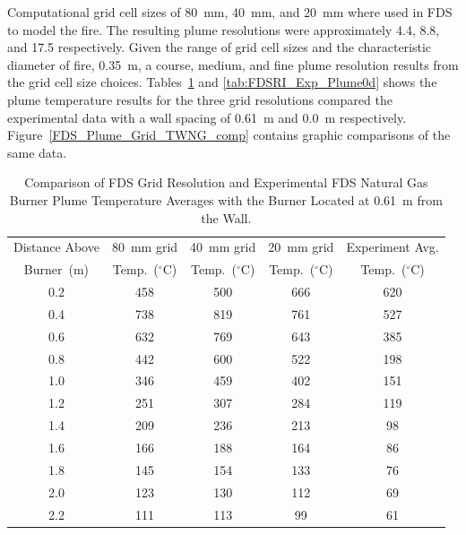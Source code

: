 \documentclass[twoside]{uocthesis}
\begin{document}
Computational grid cell sizes of 80~mm, 40~mm, and 20~mm where used in FDS to model the fire.  The resulting plume resolutions were approximately 4.4, 8.8, and 17.5 respectively. Given the range of grid cell sizes and the characteristic diameter of fire, 0.35~m, a course, medium, and fine plume resolution results from the grid cell size choices. Tables~\ref{tab:FDSRI_Exp_Plume2d} and \ref{tab:FDSRI_Exp_Plume0d} shows the plume temperature results for the three grid resolutions compared the experimental data with a wall spacing of 0.61~m and 0.0~m respectively. Figure~\ref{FDS_Plume_Grid_TWNG_comp} contains graphic comparisons of the same data.   

\begin{table}[ht!]
  \small
  \centering
  \begin{tabular}{|c|c|c|c|c|}
    \hline Distance Above  & 80~mm grid      & 40~mm grid     & 20~mm grid    & Experiment Avg. \\
    Burner~(m)     & Temp.~($^{\circ}$C) & Temp.~($^{\circ}$C) & Temp.~($^{\circ}$C)  & Temp.~($^{\circ}$C) \\ \hline
    \hline 0.2         & 458            & 500           & 666     & 620   \\
    \hline 0.4         & 738            & 819           & 761     & 527   \\
    \hline 0.6         & 632            & 769           & 643     & 385   \\
    \hline 0.8         & 442            & 600           & 522     & 198 \\
    \hline 1.0         & 346            & 459           & 402     & 151 \\
    \hline 1.2         & 251            & 307           & 284     & 119 \\
    \hline 1.4         & 209            & 236           & 213     & 98  \\
    \hline 1.6         & 166            & 188           & 164     & 86  \\
    \hline 1.8         & 145            & 154           & 133     & 76  \\
    \hline 2.0         & 123            & 130           & 112     & 69  \\
    \hline 2.2         & 111            & 113           & 99      & 61  \\
    \hline
  \end{tabular}
  \caption[Comparison of FDS Grid Resolution and Experimental FDS Natural Gas Burner Plume Temperatures, 0.61~m from the Wall]{Comparison of FDS Grid Resolution and Experimental FDS Natural Gas Burner Plume Temperature Averages with the Burner Located at 0.61~m from the Wall.}
  \label{tab:FDSRI_Exp_Plume2d}
\end{table}
\end{document}
